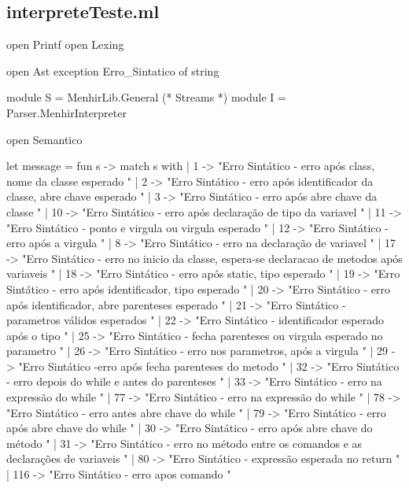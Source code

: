 \documentclass[12pt,a4paper,twoside]{report}
\begin{document}
\subsection{interpreteTeste.ml}
\begin{terminal}
open Printf
open Lexing

open Ast
exception Erro_Sintatico of string

module S = MenhirLib.General (* Streams *)
module I = Parser.MenhirInterpreter

open Semantico

let message =
  fun s ->
    match s with
    | 1 ->
        "Erro Sintático - erro após class, nome da classe esperado \n"
    | 2 ->
        "Erro Sintático  - erro após identificador da classe, abre chave esperado \n"
    | 3 ->
        "Erro Sintático - erro após abre chave da classe \n"
    | 10 ->
        "Erro Sintático - erro após declaração de tipo da variavel \n"
    | 11 ->
        "Erro Sintático - ponto e virgula ou virgula esperado \n"
    | 12 ->
        "Erro Sintático - erro após a virgula \n"
    | 8 ->
        "Erro Sintático - erro na declaração de variavel \n"
    | 17 ->
        "Erro Sintático - erro no inicio da classe, espera-se declaracao de metodos após variaveis \n"
    | 18 ->
        "Erro Sintático - erro após static, tipo esperado \n"
    | 19 ->
        "Erro Sintático - erro após identificador, tipo esperado \n"
    | 20 ->
        "Erro Sintático - erro após identificador, abre parenteses esperado \n"
    | 21 ->
        "Erro Sintático - parametros válidos esperados \n"
    | 22 ->
        "Erro Sintático - identificador esperado após o tipo \n"
    | 25 ->
        "Erro Sintático - fecha parenteses ou virgula esperado no parametro \n"
    | 26 ->
        "Erro Sintático - erro nos parametros, após a virgula \n"
    | 29 ->
        "Erro Sintático -erro após fecha parenteses do metodo \n"
    | 32 ->
        "Erro Sintático - erro depois do while e antes do parenteses \n"
    | 33 ->
        "Erro Sintático - erro na expressão do while  \n"
    | 77 ->
        "Erro Sintático - erro na expressão do while  \n"
    | 78 ->
        "Erro Sintático - erro antes abre chave do while  \n"
    | 79 ->
        "Erro Sintático - erro após abre chave do while  \n"
    | 30 ->
        "Erro Sintático - erro após abre chave do método \n"
    | 31 ->
        "Erro Sintático - erro no método entre os comandos e as declarações de variaveis  \n"
    | 80 ->
        "Erro Sintático - expressão esperada no return \n"
    | 116 ->
        "Erro Sintático - erro apos comando \n"

\end{terminal}
\end{document}
